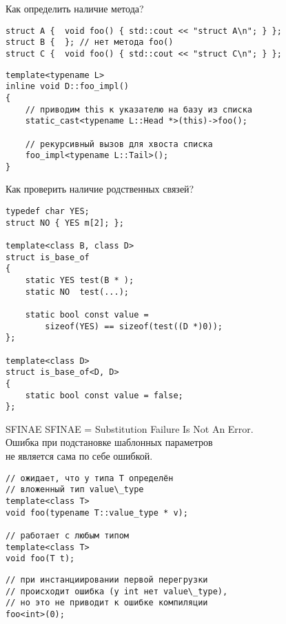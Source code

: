 \documentclass{beamer}
\begin{document}
% 
% 

\begin{frame}[fragile]{Как определить наличие метода?}
\begin{lstlisting}
struct A {  void foo() { std::cout << "struct A\n"; } };
struct B {  }; // нет метода foo()
struct C {  void foo() { std::cout << "struct C\n"; } };
\end{lstlisting}

\begin{lstlisting}
template<typename L> 
inline void D::foo_impl() 
{
    // приводим this к указателю на базу из списка
    static_cast<typename L::Head *>(this)->foo();
    
    // рекурсивный вызов для хвоста списка
    foo_impl<typename L::Tail>();
}
\end{lstlisting}
\end{frame}

\begin{frame}[fragile]{Как проверить наличие родственных связей?}
\small
\begin{lstlisting}
typedef char YES;
struct NO { YES m[2]; };

template<class B, class D>
struct is_base_of
{
    static YES test(B * );
    static NO  test(...);
    
    static bool const value = 
        sizeof(YES) == sizeof(test((D *)0));
};

template<class D> 
struct is_base_of<D, D> 
{
    static bool const value = false;
};
\end{lstlisting}
\end{frame}

\begin{frame}[fragile]{SFINAE}
 SFINAE = Substitution Failure Is Not An Error.\\
 Ошибка при подстановке шаблонных параметров \\
 не является сама по себе ошибкой.
\begin{lstlisting}
// ожидает, что у типа T определён 
// вложенный тип value\_type
template<class T>
void foo(typename T::value_type * v);

// работает с любым типом
template<class T>
void foo(T t);
\end{lstlisting}
\begin{lstlisting}
// при инстанциировании первой перегрузки
// происходит ошибка (у int нет value\_type), 
// но это не приводит к ошибке компиляции
foo<int>(0);
\end{lstlisting}
\end{frame}
\end{document}
